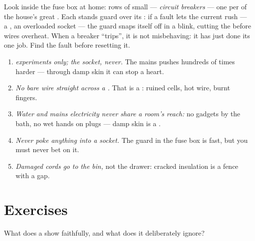 \begin{remark}\label{rem:g6:circuits-and-safety:guards}
Look inside the fuse box at home: rows of small  ---
\emph{circuit breakers} --- one per  of the house's great
. Each stands guard over its : if a fault
lets the current rush --- a , an overloaded socket
--- the guard snaps itself off in a blink, cutting the 
before wires overheat. When a breaker ``trips'', it is not
misbehaving: it has just done its one job. Find the fault before
resetting it.
\end{remark}

\begin{remark}\label{rem:g6:circuits-and-safety:rules}
\begin{enumerate}
  \item \emph{ experiments only; the socket, never.} The
        mains pushes hundreds of times harder --- through damp
        skin it can stop a heart.
  \item \emph{No bare wire straight across a .} That is a
        : ruined cells, hot wire, burnt fingers.
  \item \emph{Water and mains electricity never share a room's
        reach:} no gadgets by the bath, no wet hands on plugs ---
        damp skin is a .
  \item \emph{Never poke anything into a socket.} The guard in
        the fuse box is fast, but you must never bet on it.
  \item \emph{Damaged cords go to the bin,} not the drawer:
        cracked insulation is a fence with a gap.
\end{enumerate}
\end{remark}

\section{Exercises}

\begin{exercise}[$\star$]\label{exo:g6:circuits-and-safety:1}
What does a  show faithfully, and what does it
deliberately ignore?
\end{exercise}


